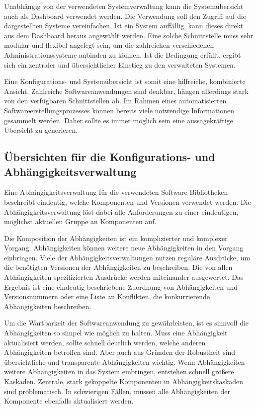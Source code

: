 Unabhängig von der verwendeten Systemverwaltung kann die Systemübersicht auch als Dashboard verwendet werden. Die Verwendung soll den Zugriff auf die dargestellten Systeme vereinfachen. Ist ein System auffällig, kann dieses direkt aus dem Dashboard heraus angewählt werden. Eine solche Schnittstelle muss sehr modular und flexibel angelegt sein, um die zahlreichen verschiedenen Administrationssysteme anbinden zu können. Ist die Bedingung erfüllt, ergibt sich ein zentraler und übersichtlicher Einstieg zu den verwalteten Systemen.

Eine Konfigurations- und Systemübersicht ist somit eine hilfreiche, kombinierte Ansicht. Zahlreiche Softwareanwendungen sind denkbar, hängen allerdings stark von den verfügbaren Schnittstellen ab. Im Rahmen eines automatisierten Softwareerstellungsprozesses können bereits viele notwendige Informationen gesammelt werden. Daher sollte es immer möglich sein eine aussagekräftige Übersicht zu generieren.

\subsection{Übersichten für die Konfigurations- und Abhängigkeitsverwaltung}

Eine Abhängigkeitsverwaltung für die verwendeten Software-Bibliotheken beschreibt eindeutig, welche Komponenten und Versionen verwendet werden. Die Abhängigkeitsverwaltung löst dabei alle Anforderungen zu einer eindeutigen, möglichst aktuellen Gruppe an Komponenten auf. 

Die Komposition der Abhängigkeiten ist ein komplizierter und komplexer Vorgang. Abhängigkeiten können weitere neue Abhängigkeiten in den Vorgang einbringen. Viele der Abhängigkeitsverwaltungen nutzen reguläre Ausdrücke, um die benötigten Versionen der Abhängigkeiten zu beschreiben. Die von allen Abhängigkeiten spezifizierten Ausdrücke werden miteinander ausgewertet. Das Ergebnis ist eine eindeutig beschriebene Zuordnung von Abhängigkeiten und Versionsnummern oder eine Liste an Konflikten, die konkurrierende Abhängigkeiten beschreiben.

Um die Wartbarkeit der Softwareanwendung zu gewährleisten, ist es sinnvoll die Abhängigkeiten so simpel wie möglich zu halten. Muss eine Abhängigkeit aktualisiert werden, sollte schnell deutlich werden, welche anderen Abhängigkeiten betroffen sind.
Aber auch aus Gründen der Robustheit sind übersichtliche und transparente Abhängigkeiten wichtig. Wenn Abhängigkeiten weitere Abhängigkeiten in das System einbringen, entstehen schnell größere Kaskaden. Zentrale, stark gekoppelte Komponenten in Abhängigkeitskaskaden sind problematisch. In schwierigen Fällen, müssen alle Abhängigkeiten der Komponente ebenfalls aktualisiert werden.

